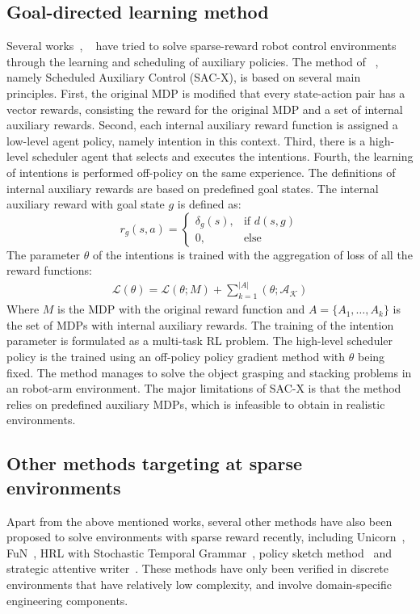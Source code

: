 \subsection{Goal-directed learning method}
Several works~\cite{riedmiller2018learning}, ~\cite{andrychowicz2017hindsight} have tried to solve sparse-reward robot control environments through the learning and scheduling of auxiliary policies.
The method of ~\cite{riedmiller2018learning}, namely Scheduled Auxiliary Control (SAC-X), is based on several main principles. First, the original MDP is modified that every state-action pair has a vector rewards, consisting the reward for the original MDP and a set of internal auxiliary rewards. Second, each internal auxiliary reward function is assigned a low-level agent policy, namely intention in this context. Third, there is a high-level scheduler agent that selects and executes the intentions. Fourth, the learning of intentions is performed off-policy on the same experience.
The definitions of internal auxiliary rewards are based on predefined goal states. The  internal auxiliary reward with goal state $g$ is defined as:
\begin{equation}
r_g(s,a)=
\begin{cases}
\delta_g(s),& \text{if } d(s,g)\\
0,              & \text{else}
\end{cases}
\end{equation}
The parameter $\theta$ of the intentions is trained with the aggregation of loss of all the reward functions:
\begin{align}
\mathcal{L}(\theta)  = \mathcal{L}(\theta;M) +\sum_{k=1}^{|A|} (\mathcal{\theta;A_K})
\end{align}
Where $M$ is the MDP with the original reward function and $A=\{A_1,\dots,A_k\}$ is the set of MDPs with internal auxiliary rewards. The training of the intention parameter is formulated as a multi-task RL problem.
The high-level scheduler policy is the trained using an off-policy policy gradient method with $\theta$ being fixed.
The method manages to solve the object grasping and stacking problems in an robot-arm environment. The major limitations of SAC-X is that the method relies on predefined auxiliary MDPs, which is infeasible to obtain in realistic environments.


\subsection{Other methods targeting at sparse environments}
Apart from the above mentioned works, several other methods have also been proposed to solve environments with sparse reward recently, including Unicorn~\cite{mankowitz2018unicorn}, FuN~\cite{vezhnevets2017feudal},  HRL with Stochastic Temporal Grammar~\cite{shu2017hierarchical}, policy sketch method~\cite{andreas2016modular} and strategic attentive writer~\cite{vezhnevets2016strategic}. These methods have only been verified in discrete environments that have relatively low complexity, and involve domain-specific engineering components.